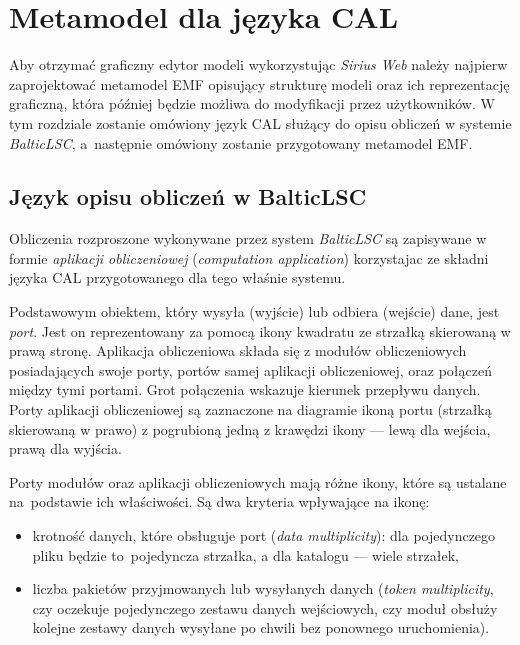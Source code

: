 \chapter{Metamodel dla języka CAL}\label{chapter:cal-metamodel}

Aby otrzymać graficzny edytor modeli wykorzystując \emph{Sirius Web} należy
najpierw zaprojektować metamodel \gls{EMF} opisujący strukturę modeli oraz ich
reprezentację graficzną, która później będzie możliwa do modyfikacji przez
użytkowników. W tym rozdziale
zostanie omówiony język \acrfull{CAL} służący do opisu obliczeń w systemie
\emph{BalticLSC}, a~następnie omówiony zostanie przygotowany metamodel
\gls{EMF}.

\section{Język opisu obliczeń w BalticLSC}

Obliczenia rozproszone wykonywane przez system \emph{BalticLSC} są zapisywane w
formie \emph{aplikacji obliczeniowej}
(\emph{computation application})
korzystajac ze składni języka \acrfull{CAL} przygotowanego dla tego właśnie
systemu.

Podstawowym obiektem, który wysyła (wyjście)
lub odbiera (wejście) dane, jest \emph{port}. Jest on reprezentowany za pomocą
ikony kwadratu ze strzałką skierowaną w prawą stronę. Aplikacja obliczeniowa
składa
się z modułów obliczeniowych posiadających swoje porty, portów samej aplikacji
obliczeniowej, oraz połączeń między tymi portami. Grot połączenia wskazuje
kierunek przepływu danych.
Porty aplikacji obliczeniowej są zaznaczone na
diagramie ikoną portu (strzałką skierowaną w prawo) z pogrubioną
jedną z krawędzi ikony --- lewą dla wejścia, prawą dla wyjścia.

Porty modułów oraz aplikacji obliczeniowych mają różne ikony, które
są ustalane na~podstawie ich właściwości. Są dwa kryteria wpływające na ikonę:

\begin{itemize}
	\item krotność danych, które obsługuje port (\emph{data
		      multiplicity}):  dla pojedynczego pliku będzie to~pojedyncza strzałka, a dla katalogu --- wiele strzałek,
	\item liczba pakietów przyjmowanych lub wysyłanych danych (\emph{token
		      multiplicity}, czy oczekuje pojedynczego zestawu danych wejściowych, czy moduł obsłuży kolejne zestawy danych wysyłane po chwili bez ponownego uruchomienia).
\end{itemize}

